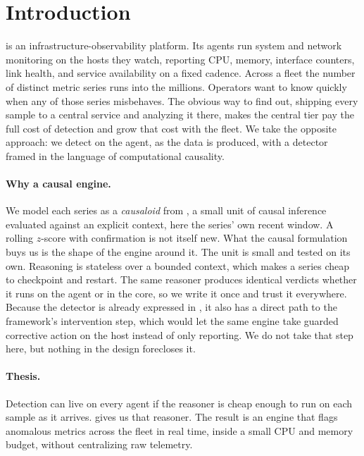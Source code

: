 \section{Introduction}
\label{sec:intro}

\sysname is an infrastructure-observability platform. Its agents run system and
network monitoring on the hosts they watch, reporting CPU, memory, interface
counters, link health, and service availability on a fixed cadence. Across a fleet
the number of distinct metric series runs into the millions. Operators want to know
quickly when any of those series misbehaves. The obvious way to find out, shipping
every sample to a central service and analyzing it there, makes the central tier
pay the full cost of detection and grow that cost with the fleet. We take the
opposite approach: we detect on the agent, as the data is produced, with a detector
framed in the language of computational causality.

\paragraph{Why a causal engine.}
We model each series as a \emph{causaloid} from \dc, a small unit of causal
inference evaluated against an explicit context, here the series' own recent window.
A rolling $z$-score with confirmation is not itself new. What the causal formulation
buys us is the shape of the engine around it. The unit is small and tested on its
own. Reasoning is stateless over a bounded context, which makes a series cheap to
checkpoint and restart. The same reasoner produces identical verdicts whether it
runs on the agent or in the core, so we write it once and trust it everywhere.
Because the detector is already expressed in \dc, it also has a direct path to the
framework's intervention step, which would let the same engine take guarded
corrective action on the host instead of only reporting. We do not take that step
here, but nothing in the design forecloses it.

\paragraph{Thesis.}
Detection can live on every agent if the reasoner is cheap enough to run on each
sample as it arrives. \dc{} gives us that reasoner. The result is an engine that
flags anomalous metrics across the fleet in real time, inside a small CPU and
memory budget, without centralizing raw telemetry.

